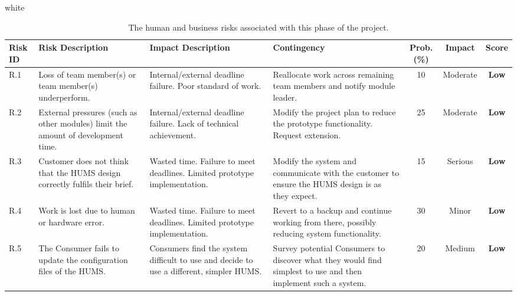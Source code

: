 \documentclass[10pt,a4paper]{article}
\newcommand{\xtableformat}[4]{
\begin{table}[ht!]
\centering
  \rowcolors{2}{gray!10} {white}
\begin{tabularx}{\textwidth}{#1}
  \hline
  \rowcolor[gray]{0.9} #2
  \hline
\end{tabularx}
\caption{#3}
\label{#4}
\end{table}}
\begin{document}
\xtableformat{p{0.8cm} X X X c c c }
{ 	\hline
  	Risk ID & Risk \newline Description & Impact \newline Description & Contingency & Prob. (\%) & Impact & Score \\
  	\hline
  
    R.1 & Loss of team member(s) or team member(s) underperform. & Internal/external deadline failure. Poor standard of work. & Reallocate work across remaining team members and notify module leader. & 10 & Moderate & \textbf{Low} \\
    R.2 & External pressures (such as other modules) limit the amount of development time. & Internal/external deadline failure. Lack of technical achievement. & Modify the project plan to reduce the prototype functionality. Request extension. & 25 & Moderate &  \textbf{Low} \\
    R.3 & Customer does not think that the HUMS design correctly fulfils their brief. & Wasted time. Failure to meet deadlines. Limited prototype implementation. & Modify the system and communicate with the customer to ensure the HUMS design is as they expect. & 15 & Serious &  \textbf{Low} \\
    R.4 & Work is lost due to human or hardware error. & Wasted time. Failure to meet deadlines. Limited prototype implementation. & Revert to a backup and continue working from there, possibly reducing system functionality. & 30 & Minor &  \textbf{Low} \\
    R.5 & The Consumer fails to update the configuration files of the HUMS. & Consumers find the system difficult to use and decide to use a different, simpler HUMS. & Survey potential Consumers to discover what they would find simplest to use and then implement such a system. & 20 & Medium & \textbf{Low} \\	
}
{The human and business risks associated with this phase of the project.}{tab:human_risks}
\end{document}
